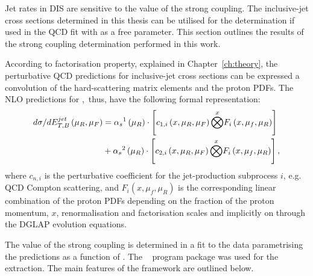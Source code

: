Jet rates in DIS are sensitive to the value of the strong coupling. The inclusive-jet cross sections determined in this thesis can be utilised for the \as determination if used in the QCD fit with \as as a free parameter. This section outlines the results of the strong coupling determination performed in this work.

According to factorisation property, explained in Chapter~\ref{ch:theory}, the perturbative QCD predictions for inclusive-jet cross sections can be expressed a convolution of the hard-scattering matrix elements and the proton PDFs. The NLO predictions for \dsdetjetb,~thus, have the following formal representation:
\begin{equation}
	\begin{split}
\mbox{$d\sigma/dE_{T,B}^{jet}$}\left( \mu_R, \mu_F\right) &= \mbox{$\alpha_{s}$}^1\left( \mu_R\right) \cdot \left[ c_{1,i}\left( x, \mu_R, \mu_F\right) \overset{x}{\bigotimes } F_i\left( x, \mu_f, \mu_R \right) \right] \\
&+ \mbox{$\alpha_{s}$}^2\left( \mu_R\right) \cdot \left[ c_{2,i}\left( x, \mu_R, \mu_F\right) \overset{x}{\bigotimes } F_i\left( x, \mu_f, \mu_R \right) \right],
	\end{split}
\end{equation}
where $c_{n,i}$ is the perturbative coefficient for the jet-production subprocess $i$, e.g. QCD Compton scattering, and $F_i\left( x, \mu_f, \mu_R \right)$ is the corresponding linear combination of the proton PDFs depending on the fraction of the proton momentum, $x$, renormalisation and factorisation scales and implicitly on \as through the DGLAP evolution equations.

The value of the strong coupling is determined in a fit to the data parametrising the predictions as a function of \as. The \herafitter~\cite{Aaron:2009aa,Aaron:2009kv} program package was used for the \as extraction. The main features of the \herafitter framework are outlined below.

